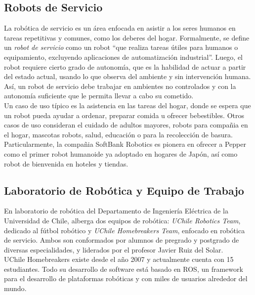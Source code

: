 \documentclass[12pt,letterpaper,spanish]{article}
\begin{document}
\subsection{Robots de Servicio}

La rob\'otica de servicio es un \'area enfocada en asistir a los seres humanos en tareas repetitivas y comunes, como los deberes del hogar. Formalmente, se define un \textit{robot de servicio} como un robot ``que realiza tareas \'utiles para humanos o equipamiento, excluyendo aplicaciones de automatizaci\'on industrial''\cite{IFR}. Luego, el robot requiere cierto grado de autonom\'ia, que es la habilidad de actuar a partir del estado actual, usando lo que observa del ambiente y sin intervenci\'on humana. As\'i, un robot de servicio debe trabajar en ambientes no controlados y con la autonom\'ia suficiente que le permita llevar a cabo su cometido.\\

Un caso de uso t\'ipico es la asistencia en las tareas del hogar, donde se espera que un robot pueda ayudar a ordenar, preparar comida u ofrecer bebestibles. Otros casos de uso consideran el cuidado de adultos mayores, robots para compa\~nia en el hogar, mascotas robots, salud, educaci\'on o para la recolecci\'on de basura. Particularmente, la compa\~nia SoftBank Robotics es pionera en ofrecer a Pepper como el primer robot humanoide ya adoptado en hogares de Jap\'on, as\'i como robot de bienvenida en hoteles y tiendas\cite{softbank}.\\


\subsection{Laboratorio de Rob\'otica y Equipo de Trabajo}

En laboratorio de rob\'otica del Departamento de Ingenier\'ia El\'ectrica de la Universidad de Chile, alberga dos equipos de rob\'otica: \textit{UChile Robotics Team}, dedicado al fútbol rob\'otico y \textit{UChile Homebreakers Team}, enfocado en rob\'otica de servicio. Ambos son conformados por alumnos de pregrado y postgrado de diversas especialidades, y liderados por el profesor Javier Ruiz del Solar\cite{uchile-robotics}.\\

UChile Homebreakers existe desde el a\~no 2007 y actualmente cuenta con 15 estudiantes. Todo su desarrollo de software est\'a basado en ROS, un framework para el desarrollo de plataformas rob\'oticas y con miles de usuarios alrededor del mundo\cite{ROS:2009}.\\
\end{document}
